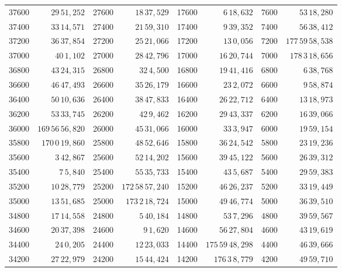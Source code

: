 \begin{tabular}{|r|r||r|r||r|r||r|r|}
37600 & \(29\,51,\!252\) & 27600 & \(18\,37,\!529\) & 17600 & \(6\,18,\!632\) & 7600 & \(53\,18,\!280\) \\
37400 & \(33\,14,\!571\) & 27400 & \(21\,59,\!310\) & 17400 & \(9\,39,\!352\) & 7400 & \(56\,38,\!412\) \\
37200 & \(36\,37,\!854\) & 27200 & \(25\,21,\!066\) & 17200 & \(13\,0,\!056\) & 7200 & \(177\,59\,58,\!538\) \\
37000 & \(40\,1,\!102\) & 27000 & \(28\,42,\!796\) & 17000 & \(16\,20,\!744\) & 7000 & \(178\,3\,18,\!656\) \\[1pt]
36800 & \(43\,24,\!315\) & 26800 & \(32\,4,\!500\) & 16800 & \(19\,41,\!416\) & 6800 & \(6\,38,\!768\) \\
36600 & \(46\,47,\!493\) & 26600 & \(35\,26,\!179\) & 16600 & \(23\,2,\!072\) & 6600 & \(9\,58,\!874\) \\
36400 & \(50\,10,\!636\) & 26400 & \(38\,47,\!833\) & 16400 & \(26\,22,\!712\) & 6400 & \(13\,18,\!973\) \\
36200 & \(53\,33,\!745\) & 26200 & \(42\,9,\!462\) & 16200 & \(29\,43,\!337\) & 6200 & \(16\,39,\!066\) \\
36000 & \(169\,56\,56,\!820\) & 26000 & \(45\,31,\!066\) & 16000 & \(33\,3,\!947\) & 6000 & \(19\,59,\!154\) \\[1pt]
35800 & \(170\,0\,19,\!860\) & 25800 & \(48\,52,\!646\) & 15800 & \(36\,24,\!542\) & 5800 & \(23\,19,\!236\) \\
35600 & \(3\,42,\!867\) & 25600 & \(52\,14,\!202\) & 15600 & \(39\,45,\!122\) & 5600 & \(26\,39,\!312\) \\
35400 & \(7\,5,\!840\) & 25400 & \(55\,35,\!733\) & 15400 & \(43\,5,\!687\) & 5400 & \(29\,59,\!383\) \\
35200 & \(10\,28,\!779\) & 25200 & \(172\,58\,57,\!240\) & 15200 & \(46\,26,\!237\) & 5200 & \(33\,19,\!449\) \\
35000 & \(13\,51,\!685\) & 25000 & \(173\,2\,18,\!724\) & 15000 & \(49\,46,\!774\) & 5000 & \(36\,39,\!510\) \\[1pt]
34800 & \(17\,14,\!558\) & 24800 & \(5\,40,\!184\) & 14800 & \(53\,7,\!296\) & 4800 & \(39\,59,\!567\) \\
34600 & \(20\,37,\!398\) & 24600 & \(9\,1,\!620\) & 14600 & \(56\,27,\!804\) & 4600 & \(43\,19,\!619\) \\
34400 & \(24\,0,\!205\) & 24400 & \(12\,23,\!033\) & 14400 & \(175\,59\,48,\!298\) & 4400 & \(46\,39,\!666\) \\
34200 & \(27\,22,\!979\) & 24200 & \(15\,44,\!424\) & 14200 & \(176\,3\,8,\!779\) & 4200 & \(49\,59,\!710\) \\

\end{tabular}
